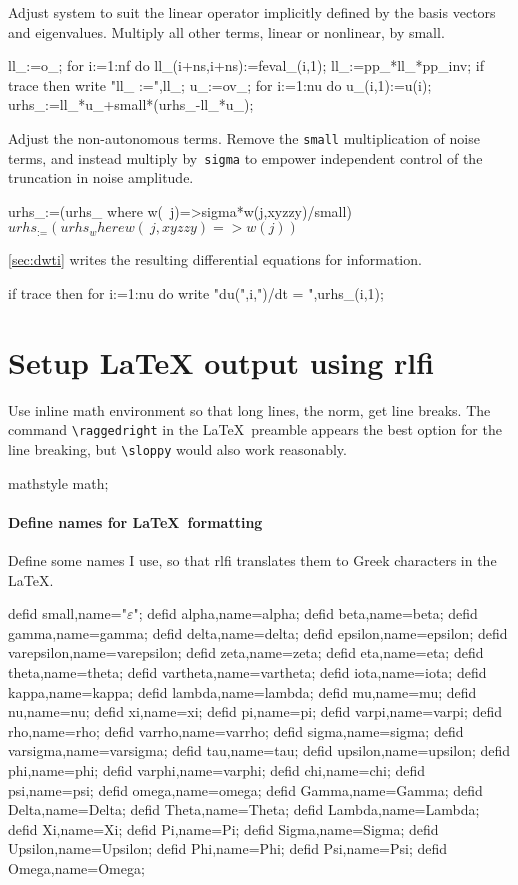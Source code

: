 \documentclass[11pt,a5paper]{article}
\def\eps{\ensuremath{\varepsilon}}
\begin{document}
Adjust system to suit the linear operator implicitly defined
by the basis vectors and eigenvalues.  Multiply all other
terms, linear or nonlinear, by small.
\begin{reduce}
ll_:=o_;  
for i:=1:nf do ll_(i+ns,i+ns):=feval_(i,1);
ll_:=pp_*ll_*pp_inv;
if trace then write "ll_ :=",ll_;
u_:=ov_;
for i:=1:nu do u_(i,1):=u(i);
urhs_:=ll_*u_+small*(urhs_-ll_*u_);
\end{reduce}

Adjust the non-autonomous terms. Remove the \verb|small|
multiplication of noise terms, and instead multiply
by~\verb|sigma| to empower independent control of the
truncation in noise amplitude.
\begin{reduce}
urhs_:=(urhs_ where w(~j)=>sigma*w(j,xyzzy)/small)$
urhs_:=(urhs_ where w(~j,xyzzy)=>w(j))$
\end{reduce}
\cref{sec:dwti} writes the resulting differential
equations for information.
\begin{reduce}
if trace then for i:=1:nu do 
    write "du(",i,")/dt = ",urhs_(i,1);
\end{reduce}






\section{Setup LaTeX output using rlfi}

Use inline math environment so that long lines, the norm,
get line breaks. The command \verb|\raggedright| in the
\LaTeX\ preamble appears the best option for the line
breaking, but \verb|\sloppy| would also work reasonably.
\begin{reduce}
mathstyle math;
\end{reduce}

\paragraph{Define names for \LaTeX\ formatting}

Define some names I use, so that rlfi translates them to
Greek characters in the \LaTeX.
\begin{reduce}
defid small,name="\eps";%
defid alpha,name=alpha;
defid beta,name=beta;
defid gamma,name=gamma;
defid delta,name=delta;
defid epsilon,name=epsilon;
defid varepsilon,name=varepsilon;
defid zeta,name=zeta;
defid eta,name=eta;
defid theta,name=theta;
defid vartheta,name=vartheta;
defid iota,name=iota;
defid kappa,name=kappa;
defid lambda,name=lambda;
defid mu,name=mu;
defid nu,name=nu;
defid xi,name=xi;
defid pi,name=pi;
defid varpi,name=varpi;
defid rho,name=rho;
defid varrho,name=varrho;
defid sigma,name=sigma;
defid varsigma,name=varsigma;
defid tau,name=tau;
defid upsilon,name=upsilon;
defid phi,name=phi;
defid varphi,name=varphi;
defid chi,name=chi;
defid psi,name=psi;
defid omega,name=omega;
defid Gamma,name=Gamma;
defid Delta,name=Delta;
defid Theta,name=Theta;
defid Lambda,name=Lambda;
defid Xi,name=Xi;
defid Pi,name=Pi;
defid Sigma,name=Sigma;
defid Upsilon,name=Upsilon;
defid Phi,name=Phi;
defid Psi,name=Psi;
defid Omega,name=Omega;
\end{reduce}
\end{document}
